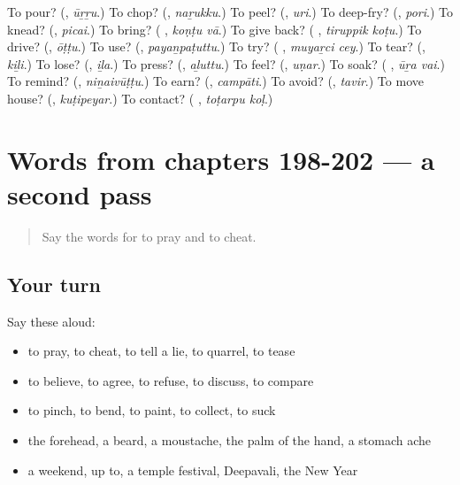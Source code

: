 \begin{tcolorbox}[breakable,colback=teal!4,colframe=teal!35!black,title={Before you move on}]
To pour? (\textbf{}, \emph{ūṟṟu}.) To chop? (\textbf{}, \emph{naṟukku}.) To peel? (\textbf{}, \emph{uri}.) To deep-fry? (\textbf{}, \emph{pori}.) To knead? (\textbf{}, \emph{picai}.) To bring? (\textbf{ }, \emph{koṇṭu vā}.) To give back? (\textbf{ }, \emph{tiruppik koṭu}.) To drive? (\textbf{}, \emph{ōṭṭu}.) To use? (\textbf{}, \emph{payaṉpaṭuttu}.) To try? (\textbf{ }, \emph{muyaṟci cey}.) To tear? (\textbf{}, \emph{kiḻi}.) To lose? (\textbf{}, \emph{iḻa}.) To press? (\textbf{}, \emph{aḻuttu}.) To feel? (\textbf{}, \emph{uṇar}.) To soak? (\textbf{ }, \emph{ūṟa vai}.) To remind? (\textbf{}, \emph{niṉaivūṭṭu}.) To earn? (\textbf{}, \emph{campāti}.) To avoid? (\textbf{}, \emph{tavir}.) To move house? (\textbf{}, \emph{kuṭipeyar}.) To contact? (\textbf{ }, \emph{toṭarpu koḷ}.)
\end{tcolorbox}
\section[(dialogue)]{Words from chapters 198-202 — a second pass}

\label{lesson:TA-R202-second-pass-words-from-chapters-198-202}



\begin{quote}
Say the words for to pray and to cheat.
\end{quote}

\subsection*{Your turn}
Say these aloud:

\begin{itemize}
\raggedright
  \item to pray, to cheat, to tell a lie, to quarrel, to tease
  \item to believe, to agree, to refuse, to discuss, to compare
  \item to pinch, to bend, to paint, to collect, to suck
  \item the forehead, a beard, a moustache, the palm of the hand, a stomach ache
  \item a weekend, up to, a temple festival, Deepavali, the New Year
\end{itemize}

